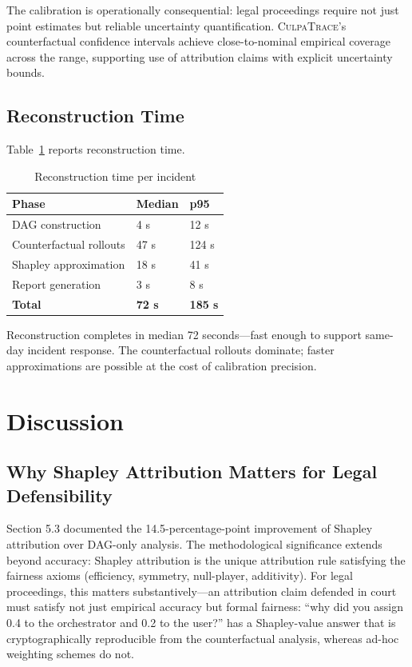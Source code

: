 \documentclass[sigconf,nonacm]{acmart}
\begin{document}
The calibration is operationally consequential: legal proceedings
require not just point estimates but reliable uncertainty
quantification. \textsc{CulpaTrace}'s counterfactual confidence
intervals achieve close-to-nominal empirical coverage across the
range, supporting use of attribution claims with explicit
uncertainty bounds.

\subsection{Reconstruction Time}

Table~\ref{tab:time} reports reconstruction time.

\begin{table}[h]
\caption{Reconstruction time per incident}
\label{tab:time}
\small
\begin{tabularx}{\columnwidth}{@{}p{2.6cm}X X@{}}
\toprule
\textbf{Phase} & \textbf{Median} & \textbf{p95} \\
\midrule
DAG construction         & 4 s & 12 s \\
Counterfactual rollouts  & 47 s & 124 s \\
Shapley approximation    & 18 s & 41 s \\
Report generation        & 3 s & 8 s \\
\textbf{Total}           & \textbf{72 s} & \textbf{185 s} \\
\bottomrule
\end{tabularx}
\end{table}

Reconstruction completes in median 72 seconds---fast enough to
support same-day incident response. The counterfactual rollouts
dominate; faster approximations are possible at the cost of
calibration precision.

\section{Discussion}

\subsection{Why Shapley Attribution Matters for Legal Defensibility}

Section 5.3 documented the 14.5-percentage-point improvement of
Shapley attribution over DAG-only analysis. The methodological
significance extends beyond accuracy: Shapley attribution is the
unique attribution rule satisfying the fairness axioms
(efficiency, symmetry, null-player, additivity). For legal
proceedings, this matters substantively---an attribution claim
defended in court must satisfy not just empirical accuracy but
formal fairness: ``why did you assign 0.4 to the orchestrator and
0.2 to the user?'' has a Shapley-value answer that is
cryptographically reproducible from the counterfactual analysis,
whereas ad-hoc weighting schemes do not.
\end{document}
